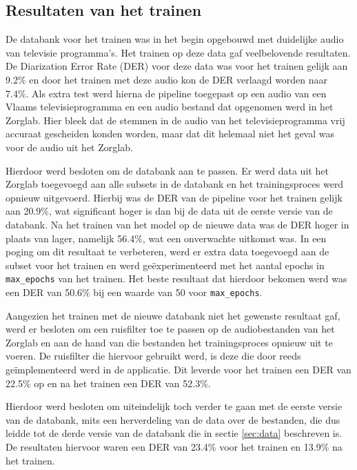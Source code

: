 \subsection{Resultaten van het trainen}
\label{subsec:train-res}

De databank voor het trainen was in het begin opgebouwd met duidelijke audio van televisie programma's. Het trainen op deze data gaf veelbelovende resultaten. De Diarization Error Rate (DER) voor deze data was voor het trainen gelijk aan 9.2\% en door het trainen met deze audio kon de DER verlaagd worden naar 7.4\%. Als extra test werd hierna de pipeline toegepast op een audio van een Vlaams televisieprogramma en een audio bestand dat opgenomen werd in het Zorglab. Hier bleek dat de stemmen in de audio van het televisieprogramma vrij accuraat gescheiden konden worden, maar dat dit helemaal niet het geval was voor de audio uit het Zorglab.

Hierdoor werd besloten om de databank aan te passen. Er werd data uit het Zorglab toegevoegd aan alle subsets in de databank en het trainingsproces werd opnieuw uitgevoerd. Hierbij was de DER van de pipeline voor het trainen gelijk aan 20.9\%, wat significant hoger is dan bij de data uit de eerste versie van de databank. Na het trainen van het model op de nieuwe data was de DER hoger in plaats van lager, namelijk 56.4\%, wat een onverwachte uitkomst was. In een poging om dit resultaat te verbeteren, werd er extra data toegevoegd aan de subset voor het trainen en werd geëxperimenteerd met het aantal epochs in \lstinline{max_epochs} van het trainen. Het beste resultaat dat hierdoor bekomen werd was een DER van 50.6\% bij een waarde van 50 voor \lstinline{max_epochs}.

Aangezien het trainen met de nieuwe databank niet het gewenste resultaat gaf, werd er besloten om een ruisfilter toe te passen op de audiobestanden van het Zorglab en aan de hand van die bestanden het trainingsproces opnieuw uit te voeren. De ruisfilter die hiervoor gebruikt werd, is deze die door \textcite{Daems2023} reeds geïmplementeerd werd in de applicatie. Dit leverde voor het trainen een DER van 22.5\% op en na het trainen een DER van 52.3\%.

Hierdoor werd besloten om uiteindelijk toch verder te gaan met de eerste versie van de databank, mits een herverdeling van de data over de bestanden, die dus leidde tot de derde versie van de databank die in sectie \ref{sec:data} beschreven is. De resultaten hiervoor waren een DER van 23.4\% voor het trainen en 13.9\% na het trainen.


